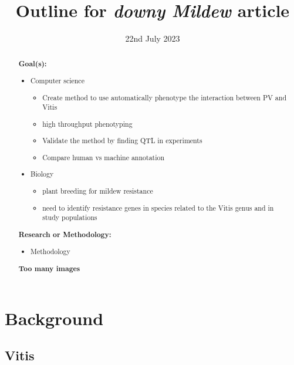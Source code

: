 \documentclass[english]{article}
\title{ Outline for \textit{downy Mildew} article}
\date{22nd July 2023}
\author{}
\begin{document}
\maketitle

\begin{changemargin}{60pt}{60pt}
	\begin{abstract}
		\textbf{Goal(s):}
		\begin{itemize}
                \item Computer science
                \begin{itemize}
    			\item Create method to use automatically phenotype the interaction between PV and Vitis
                    \item high throughput phenotyping
    			\item Validate the method by finding QTL in  experiments
    			\item Compare human vs machine annotation
                \end{itemize}
                \item Biology
                \begin{itemize}
                    \item plant breeding for mildew resistance
                    \item need to identify resistance genes in species related to the Vitis genus and in study populations
                \end{itemize}
		\end{itemize}

		\textbf{Research or Methodology:}
		\begin{itemize}
			\item Methodology
		\end{itemize}

		\textbf{Too many images}
  
	\end{abstract}
\end{changemargin}

\tableofcontents

\section{Background}

\subsection{Vitis}
\end{document}
